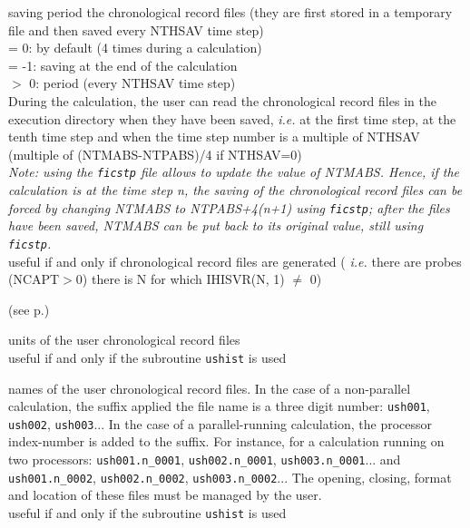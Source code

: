 {saving period the chronological record files (they are first stored in a
temporary file and then saved every NTHSAV time step)\\
\hspace*{1.3cm}= 0: by default (4 times during a calculation)\\
\hspace*{1.3cm}= -1: saving at the end of the calculation\\
\hspace*{1.3cm}$>$ 0: period (every NTHSAV time step)\\
During the calculation, the user can read the chronological record files
in the execution directory when they have been saved, {\em i.e.} at the first
time step, at the tenth time step and when the time step number is a multiple of
NTHSAV (multiple of (NTMABS-NTPABS)/4 if NTHSAV=0)\\
{\em Note: using the \texttt{ficstp} file allows to update the value of
NTMABS. Hence, if the calculation is at the time step n, the saving of the
chronological record files can be forced by changing NTMABS to NTPABS+4(n+1)
using \texttt{ficstp}; after the files have been saved, NTMABS can be put back
to its original value, still using \texttt{ficstp}.}\\
useful if and only if chronological record files are generated ({\em
i.e.} there are probes (NCAPT$>$0) there is N for which IHISVR(N, 1)
$\ne$ 0)}

(see p.\pageref{prg_ushist})

{units of the user chronological record files\\
useful if and only if the subroutine \texttt{ushist} is used}

{names of the user chronological record files.
In the case of a non-parallel calculation, the suffix applied the file
name is a three digit number: \texttt{ush001}, \texttt{ush002},
\texttt{ush003}...  
In the case of a parallel-running calculation, the processor
index-number is added to the suffix. For instance, for a calculation
running on two processors:  \texttt{ush001.n\_0001},
\texttt{ush002.n\_0001}, \texttt{ush003.n\_0001}... and
\texttt{ush001.n\_0002},
\texttt{ush002.n\_0002}, \texttt{ush003.n\_0002}...
The opening, closing, format and location of these files must be managed
by the user.\\
useful if and only if the subroutine \texttt{ushist} is used}


